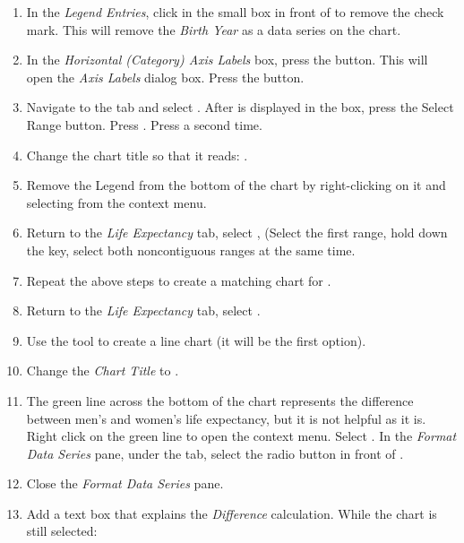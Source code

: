 \begin{enumbox}
	\begin{enumerate}
		\item In the \textit{Legend Entries}, click in the small box in front of  to remove the check mark. This will remove the \textit{Birth Year} as a data series on the chart.
		\item In the \textit{Horizontal (Category) Axis Labels} box, press the  button. This will open the \textit{Axis Labels} dialog box. Press the  button.
		\item Navigate to the  tab and select . After  is displayed in the box, press the Select Range button. Press . Press  a second time.
		\item Change the chart title so that it reads: .
		\item Remove the Legend from the bottom of the chart by right-clicking on it and selecting  from the context menu.
		\item Return to the \textit{Life Expectancy} tab, select ,  (Select the first range, hold down the  key, select both noncontiguous ranges at the same time.
		\item Repeat the above steps to create a matching chart for .
		\item Return to the \textit{Life Expectancy} tab, select .
		\item Use the  tool to create a line chart (it will be the first option).
		\item Change the \textit{Chart Title} to .
		\item The green line across the bottom of the chart represents the difference between men's and women's life expectancy, but it is not helpful as it is. Right click on the green line to open the context menu. Select . In the \textit{Format Data Series} pane, under the  tab, select the radio button in front of .
		\item Close the \textit{Format Data Series} pane.
		\item Add a text box that explains the \textit{Difference} calculation. While the chart is still selected:
		

\end{enumerate}
\end{enumbox}
